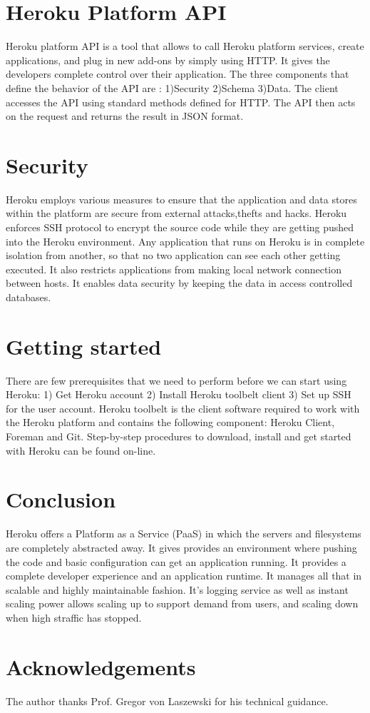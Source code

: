 \documentclass[9pt,twocolumn,twoside]{../../styles/osajnl}
\begin{document}
\section{Heroku Platform API}
	Heroku platform API is a tool that allows to call Heroku platform services,
	create applications, and plug in new add-ons by simply using HTTP. It gives the
	developers complete control over their application. The three components that
	define the behavior of the API are : 1)Security 2)Schema 3)Data. The client
	accesses the API using standard methods defined for HTTP. The API then acts on
	the request and returns the result in JSON format.

\section{Security}
	Heroku employs various measures to ensure that the application and data stores
	within the platform are secure from external attacks,thefts and hacks. Heroku
	enforces SSH\cite{SSH} protocol to encrypt the source code while they are
	getting pushed into the Heroku environment. Any application that runs on Heroku
	is in complete isolation from another, so that no two application can see
	each other getting executed. It also restricts applications from making local
	network connection between hosts. It enables data security by keeping the data
	in access controlled databases.


\section{Getting started}
	
	There are few prerequisites that we need to perform before we can start using
	Heroku: 1) Get Heroku account 2) Install Heroku toolbelt client\cite{Toolbelt} 
	3) Set up SSH for the user account. Heroku toolbelt is the client software
	required to work with the Heroku platform and contains the following component:
	Heroku Client, Foreman and Git. Step-by-step procedures to download, install 
	and get started with Heroku can be found on-line.\cite{Tutorial}

\section{Conclusion}

	Heroku offers a Platform as a Service (PaaS) in which the servers and
	filesystems are completely abstracted away. It gives provides an environment
	where pushing the code and basic configuration can get an application running.
	It provides a complete developer experience and an application runtime. It
	manages all that in scalable and highly maintainable fashion. It's logging
	service as well as instant scaling power allows scaling up to support demand
	from users, and scaling down when high straffic has stopped.

\section*{Acknowledgements}

	The author thanks Prof. Gregor von Laszewski for his technical guidance.



\end{document}
